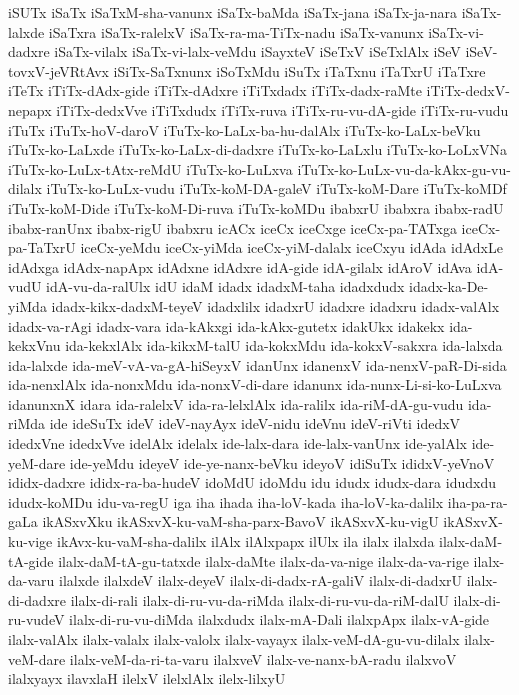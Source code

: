 {iSUTx
iSaTx
iSaTxM-sha-vanunx
iSaTx-baMda
iSaTx-jana
iSaTx-ja-nara
iSaTx-lalxde
iSaTxra
iSaTx-ralelxV
iSaTx-ra-ma-TiTx-nadu
iSaTx-vanunx
iSaTx-vi-dadxre
iSaTx-vilalx
iSaTx-vi-lalx-veMdu
iSayxteV
iSeTxV
iSeTxlAlx
iSeV
iSeV-tovxV-jeVRtAvx
iSiTx-SaTxnunx
iSoTxMdu
iSuTx
iTaTxnu
iTaTxrU
iTaTxre
iTeTx
iTiTx-dAdx-gide
iTiTx-dAdxre
iTiTxdadx
iTiTx-dadx-raMte
iTiTx-dedxV-nepapx
iTiTx-dedxVve
iTiTxdudx
iTiTx-ruva
iTiTx-ru-vu-dA-gide
iTiTx-ru-vudu
iTuTx
iTuTx-hoV-daroV
iTuTx-ko-LaLx-ba-hu-dalAlx
iTuTx-ko-LaLx-beVku
iTuTx-ko-LaLxde
iTuTx-ko-LaLx-di-dadxre
iTuTx-ko-LaLxlu
iTuTx-ko-LoLxVNa
iTuTx-ko-LuLx-tAtx-reMdU
iTuTx-ko-LuLxva
iTuTx-ko-LuLx-vu-da-kAkx-gu-vu-dilalx
iTuTx-ko-LuLx-vudu
iTuTx-koM-DA-galeV
iTuTx-koM-Dare
iTuTx-koMDf
iTuTx-koM-Dide
iTuTx-koM-Di-ruva
iTuTx-koMDu
ibabxrU
ibabxra
ibabx-radU
ibabx-ranUnx
ibabx-rigU
ibabxru
icACx
iceCx
iceCxge
iceCx-pa-TATxga
iceCx-pa-TaTxrU
iceCx-yeMdu
iceCx-yiMda
iceCx-yiM-dalalx
iceCxyu
idAda
idAdxLe
idAdxga
idAdx-napApx
idAdxne
idAdxre
idA-gide
idA-gilalx
idAroV
idAva
idA-vudU
idA-vu-da-ralUlx
idU
idaM
idadx
idadxM-taha
idadxdudx
idadx-ka-De-yiMda
idadx-kikx-dadxM-teyeV
idadxlilx
idadxrU
idadxre
idadxru
idadx-valAlx
idadx-va-rAgi
idadx-vara
ida-kAkxgi
ida-kAkx-gutetx
idakUkx
idakekx
ida-kekxVnu
ida-kekxlAlx
ida-kikxM-talU
ida-kokxMdu
ida-kokxV-sakxra
ida-lalxda
ida-lalxde
ida-meV-vA-va-gA-hiSeyxV
idanUnx
idanenxV
ida-nenxV-paR-Di-sida
ida-nenxlAlx
ida-nonxMdu
ida-nonxV-di-dare
idanunx
ida-nunx-Li-si-ko-LuLxva
idanunxnX
idara
ida-ralelxV
ida-ra-lelxlAlx
ida-ralilx
ida-riM-dA-gu-vudu
ida-riMda
ide
ideSuTx
ideV
ideV-nayAyx
ideV-nidu
ideVnu
ideV-riVti
idedxV
idedxVne
idedxVve
idelAlx
idelalx
ide-lalx-dara
ide-lalx-vanUnx
ide-yalAlx
ide-yeM-dare
ide-yeMdu
ideyeV
ide-ye-nanx-beVku
ideyoV
idiSuTx
ididxV-yeVnoV
ididx-dadxre
ididx-ra-ba-hudeV
idoMdU
idoMdu
idu
idudx
idudx-dara
idudxdu
idudx-koMDu
idu-va-regU
iga
iha
ihada
iha-loV-kada
iha-loV-ka-dalilx
iha-pa-ra-gaLa
ikASxvXku
ikASxvX-ku-vaM-sha-parx-BavoV
ikASxvX-ku-vigU
ikASxvX-ku-vige
ikAvx-ku-vaM-sha-dalilx
ilAlx
ilAlxpapx
ilUlx
ila
ilalx
ilalxda
ilalx-daM-tA-gide
ilalx-daM-tA-gu-tatxde
ilalx-daMte
ilalx-da-va-nige
ilalx-da-va-rige
ilalx-da-varu
ilalxde
ilalxdeV
ilalx-deyeV
ilalx-di-dadx-rA-galiV
ilalx-di-dadxrU
ilalx-di-dadxre
ilalx-di-rali
ilalx-di-ru-vu-da-riMda
ilalx-di-ru-vu-da-riM-dalU
ilalx-di-ru-vudeV
ilalx-di-ru-vu-diMda
ilalxdudx
ilalx-mA-Dali
ilalxpApx
ilalx-vA-gide
ilalx-valAlx
ilalx-valalx
ilalx-valolx
ilalx-vayayx
ilalx-veM-dA-gu-vu-dilalx
ilalx-veM-dare
ilalx-veM-da-ri-ta-varu
ilalxveV
ilalx-ve-nanx-bA-radu
ilalxvoV
ilalxyayx
ilavxlaH
ilelxV
ilelxlAlx
ilelx-lilxyU
}
